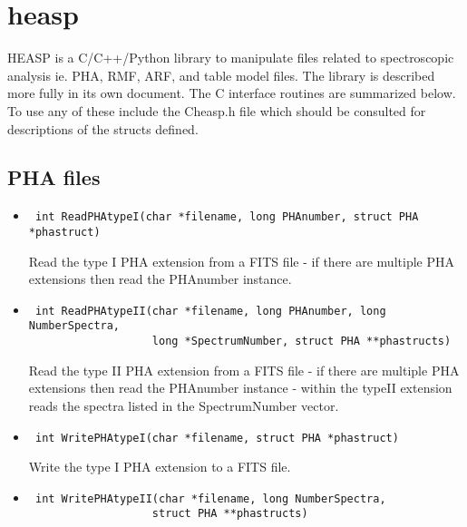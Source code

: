 \documentclass[11pt]{book}
\begin{document}
\section{heasp}

HEASP is a C/C++/Python library to manipulate files related to
spectroscopic analysis ie. PHA, RMF, ARF, and table model files. The
library is described more fully in its own document. The C
interface routines are summarized below. To use any of these include the
Cheasp.h file which should be consulted for descriptions of the
structs defined.

\subsection{PHA files}

\begin{itemize}

\item      \begin{verbatim} int ReadPHAtypeI(char *filename, long PHAnumber, struct PHA *phastruct)\end{verbatim}

               Read the type I PHA extension from a FITS file -
               if there are multiple PHA extensions then read the
               PHAnumber instance.

\item      \begin{verbatim} int ReadPHAtypeII(char *filename, long PHAnumber, long NumberSpectra,
                   long *SpectrumNumber, struct PHA **phastructs)\end{verbatim}

               Read the type II PHA extension from a FITS file - 
               if there are multiple PHA extensions then read the
               PHAnumber instance - within the typeII extension reads the
               spectra listed in the SpectrumNumber vector.

\item      \begin{verbatim} int WritePHAtypeI(char *filename, struct PHA *phastruct)\end{verbatim}

               Write the type I PHA extension to a FITS file.

\item      \begin{verbatim} int WritePHAtypeII(char *filename, long NumberSpectra, 
                   struct PHA **phastructs)\end{verbatim}


\end{itemize}
\end{document}
